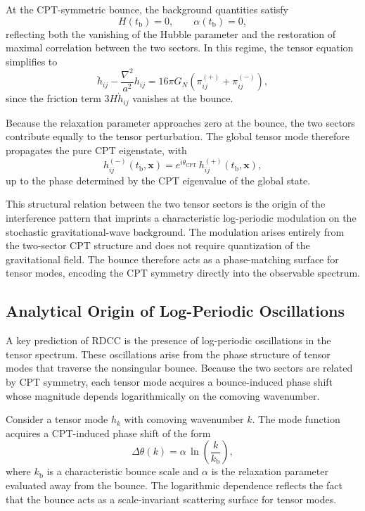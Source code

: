 \documentclass[11pt,a4paper]{article}
\begin{document}
At the CPT-symmetric bounce, the background quantities satisfy
\begin{equation}
    H(t_{\mathrm{b}}) = 0,
    \qquad
    \alpha(t_{\mathrm{b}}) = 0,
\end{equation}
reflecting both the vanishing of the Hubble parameter and the restoration of
maximal correlation between the two sectors. In this regime, the tensor equation
simplifies to
\begin{equation}
    \ddot{h}_{ij}
    - \frac{\nabla^{2}}{a^{2}} h_{ij}
    = 16\pi G_{N}\left(
        \pi^{(+)}_{ij}
        + \pi^{(-)}_{ij}
    \right),
\end{equation}
since the friction term \(3H\dot{h}_{ij}\) vanishes at the bounce.

Because the relaxation parameter approaches zero at the bounce, the two sectors
contribute equally to the tensor perturbation. The global tensor mode therefore
propagates the pure CPT eigenstate, with
\begin{equation}
    h^{(-)}_{ij}(t_{\mathrm{b}},\mathbf{x})
    = e^{i\theta_{\mathrm{CPT}}}\,
      h^{(+)}_{ij}(t_{\mathrm{b}},\mathbf{x}),
\end{equation}
up to the phase determined by the CPT eigenvalue of the global state.

This structural relation between the two tensor sectors is the origin of the
interference pattern that imprints a characteristic log-periodic modulation on
the stochastic gravitational-wave background. The modulation arises entirely
from the two-sector CPT structure and does not require quantization of the
gravitational field. The bounce therefore acts as a phase-matching surface for
tensor modes, encoding the CPT symmetry directly into the observable spectrum.

\subsection{Analytical Origin of Log-Periodic Oscillations}

A key prediction of RDCC is the presence of log-periodic oscillations in the
tensor spectrum. These oscillations arise from the phase structure of tensor
modes that traverse the nonsingular bounce. Because the two sectors are related
by CPT symmetry, each tensor mode acquires a bounce-induced phase shift whose
magnitude depends logarithmically on the comoving wavenumber.

Consider a tensor mode \(h_{k}\) with comoving wavenumber \(k\). The mode
function acquires a CPT-induced phase shift of the form
\begin{equation}
    \Delta\theta(k)
    = \alpha\,\ln\!\left(\frac{k}{k_{\mathrm{b}}}\right),
    \label{eq:phaseShift}
\end{equation}
where \(k_{\mathrm{b}}\) is a characteristic bounce scale and \(\alpha\) is the
relaxation parameter evaluated away from the bounce. The logarithmic dependence
reflects the fact that the bounce acts as a scale-invariant scattering surface
for tensor modes.
\end{document}
